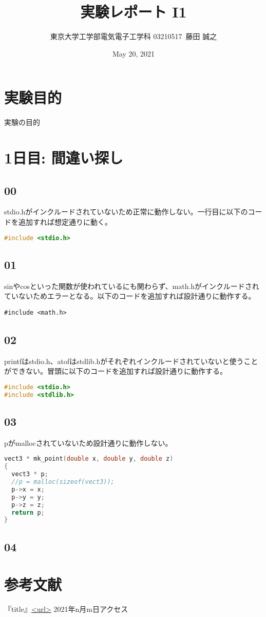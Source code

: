 \documentclass{ltjsarticle}
\title{実験レポート I1}
\author{東京大学工学部電気電子工学科 03210517\ 藤田 誠之 }
\date{ May 20, 2021}
\begin{document}
\maketitle
\section{実験目的}
実験の目的
\section{1日目: 間違い探し}
\subsection{00}
stdio.hがインクルードされていないため正常に動作しない。一行目に以下のコードを追加すれば想定通りに動く。
\begin{lstlisting}[caption=p00.c 追加部分,language=C]
#include <stdio.h>
\end{lstlisting}
\subsection{01}
sinやcosといった関数が使われているにも関わらず、math.hがインクルードされていないためエラーとなる。以下のコードを追加すれば設計通りに動作する。
\begin{lstlisting}[caption=p01.c 追加部分language=C]
#include <math.h>
\end{lstlisting}
\subsection{02}
printfはstdio.h、atofはstdlib.hがそれぞれインクルードされていないと使うことができない。冒頭に以下のコードを追加すれば設計通りに動作する。
\begin{lstlisting}[caption=p02.c 追加部分,language=C]
#include <stdio.h>
#include <stdlib.h>
\end{lstlisting}
\subsection{03}
pがmallocされていないため設計通りに動作しない。

\begin{lstlisting}[caption=p02.c 追加部分,language=C]
vect3 * mk_point(double x, double y, double z)
{
  vect3 * p;
  //p = malloc(sizeof(vect3));
  p->x = x;
  p->y = y;
  p->z = z;
  return p;
}
\end{lstlisting}
\subsection{04}




\section{参考文献}
『title』\url{<url>} 2021年n月m日アクセス
\end{document}
